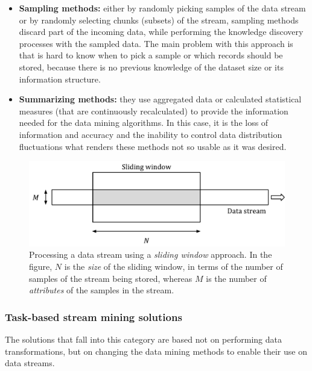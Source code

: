 \begin{itemize}
	\item \textbf{Sampling methods:} either by randomly picking samples of the data stream or by randomly selecting chunks (subsets) of the stream, sampling methods discard part of the incoming data, while performing the knowledge discovery processes with the sampled data. The main problem with this approach is that is hard to know when to pick a sample or which records should be stored, because there is no previous knowledge of the dataset size or its information structure.

	\item \textbf{Summarizing methods:} they use aggregated data or calculated statistical measures (that are continuously recalculated) to provide the information needed for the data mining algorithms. In this case, it is the loss of information and accuracy and the inability to control data distribution fluctuations what renders these methods not so usable as it was desired.
\end{itemize}

\begin{figure}
\centering
\includegraphics[width=0.9\linewidth]{figures/sliding-window.pdf}
\caption{Processing a data stream using a \textit{sliding window} approach. In the figure, $N$ is the \textit{size} of the sliding window, in terms of the number of samples of the stream being stored, whereas $M$ is the number of \textit{attributes} of the samples in the stream.}
\label{fig:sliding-window}
\end{figure}

\subsubsection*{Task-based stream mining solutions}

The solutions that fall into this category are based not on performing data transformations, but on changing the data mining methods to enable their use on data streams.

